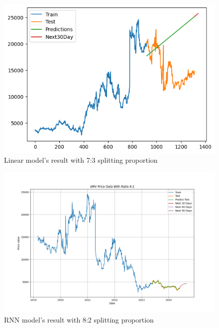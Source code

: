\documentclass{ieeeojies}
\begin{document}
\begin{figure}[H]
  \centering
  \begin{minipage}{0.8\linewidth}
    \centering
    \includegraphics[width=\linewidth]{bibliography/Figure/LN_AMV(7_3).png}
    \caption{Linear model's result with 7:3 splitting proportion}
    \label{fig8}
  \end{minipage}
\end{figure}

\begin{figure}[H]
  \centering
  \begin{minipage}{0.8\linewidth}
    \centering
    \includegraphics[width=\linewidth]{bibliography/Figure/RNN_82_AMV.png}
    \caption{RNN model's result with 8:2 splitting proportion}
    \label{fig8}
  \end{minipage}
\end{figure}
\end{document}
